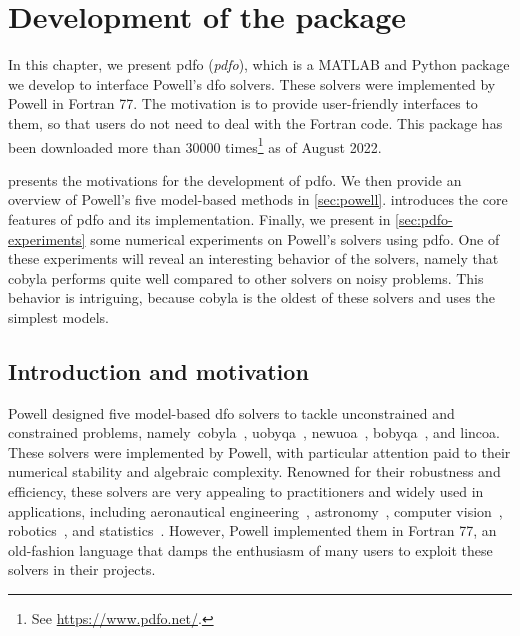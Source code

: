 %
%
%
\chapter{Development of the  package}
\label{ch:pdfo}

In this chapter, we present \gls{pdfo} (\emph{\glsdesc{pdfo}}), which is a MATLAB and Python package we develop to interface Powell's \gls{dfo} solvers.
These solvers were implemented by Powell in Fortran 77.
The motivation is to provide user-friendly interfaces to them, so that users do not need to deal with the Fortran code.
This package has been downloaded more than \num{30000} times\footnote{See \url{https://www.pdfo.net/}.} as of August 2022.

 presents the motivations for the development of \gls{pdfo}.
We then provide an overview of Powell's five model-based methods in \cref{sec:powell}.
 introduces the core features of \gls{pdfo} and its implementation.
Finally, we present in \cref{sec:pdfo-experiments} some numerical experiments on Powell's solvers using \gls{pdfo}.
One of these experiments will reveal an interesting behavior of the solvers, namely that \gls{cobyla} performs quite well compared to other solvers on noisy problems.
This behavior is intriguing, because \gls{cobyla} is the oldest of these solvers and uses the simplest models.

\section{Introduction and motivation}
\label{sec:pdfo-introduction}

Powell designed five model-based \gls{dfo} solvers to tackle unconstrained and constrained problems, namely~\gls{cobyla}~\cite{Powell_1994}, \gls{uobyqa}~\cite{Powell_2002}, \gls{newuoa}~\cite{Powell_2006}, \gls{bobyqa}~\cite{Powell_2009}, and \gls{lincoa}.
These solvers were implemented by Powell, with particular attention paid to their numerical stability and algebraic complexity.
Renowned for their robustness and efficiency, these solvers are very appealing to practitioners and widely used in applications, including aeronautical engineering~\cite{Gallard_Etal_2018}, astronomy~\cite{Biviano_Etal_2013,Mamon_Biviano_Boue_2013}, computer vision~\cite{Izadinia_Shan_Seitz_2017}, robotics~\cite{Mombaur_Truong_Laumond_2010}, and statistics~\cite{Bates_Etal_2015}.
However, Powell implemented them in Fortran 77, an old-fashion language that damps the enthusiasm of many users to exploit these solvers in their projects.


